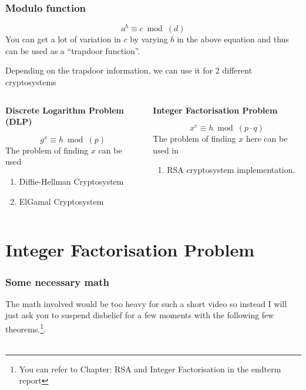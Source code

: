 \documentclass[11pt]{beamer}
\begin{document}
  \begin{frame}
    \frametitle{Modulo function}
    \[a^b \equiv c \bmod(d)\]
     You can get a lot of variation in \(c\) by varying \(b\) in the above equation and thus can be used as a ``\alert{trapdoor function}''.
  \end{frame}

  \begin{frame}
    Depending on the trapdoor information, we can use it for 2 different cryptosystems
    \begin{columns}
      \begin{column}{0.5\textwidth}
        \begin{center}
          \textbf{Discrete Logarithm Problem (DLP)}
        \end{center}
        \[g^x\equiv h\bmod(p)\]
        The problem of finding \(x\) can be used 
        \begin{enumerate}
          \item Diffie-Hellman Cryptosystem
          \item ElGamal Cryptosystem
        \end{enumerate}
      \end{column}
      \begin{column}{0.5\textwidth}  %
        \begin{center}
          \textbf{Integer Factorisation Problem}
        \end{center}
        \[x^e\equiv h \bmod(p\cdot q)\]
        The problem of finding \(x\) here can be used in
        \begin{enumerate}
          \item RSA cryptosystem implementation.
        \end{enumerate}
      \end{column}
    \end{columns}

  \end{frame}

\section{Integer Factorisation Problem}
  \begin{frame}
    \frametitle{Some necessary math}
      The math involved would be too heavy for such a short video so instead I will just ask you to suspend disbelief for a few moments with the following few theorems.\footnote{You can refer to Chapter: RSA and Integer Factorisation in the endterm report}.\\~\\
  \end{frame}
\end{document}
